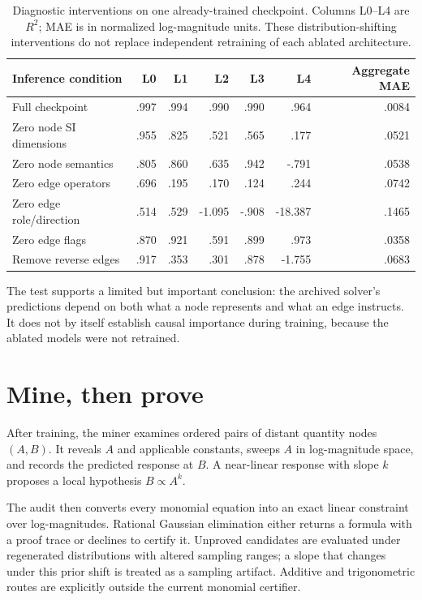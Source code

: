 \documentclass[10pt]{article}
\begin{document}
\begin{table}[H]
\centering\scriptsize
\setlength{\tabcolsep}{4.2pt}
\begin{tabular}{lrrrrrr}
\toprule
Inference condition & L0 & L1 & L2 & L3 & L4 & Aggregate MAE\\
\midrule
Full checkpoint & .997 & .994 & .990 & .990 & .964 & .0084\\
Zero node SI dimensions & .955 & .825 & .521 & .565 & .177 & .0521\\
Zero node semantics & .805 & .860 & .635 & .942 & -.791 & .0538\\
Zero edge operators & .696 & .195 & .170 & .124 & .244 & .0742\\
Zero edge role/direction & .514 & .529 & -1.095 & -.908 & -18.387 & .1465\\
Zero edge flags & .870 & .921 & .591 & .899 & .973 & .0358\\
Remove reverse edges & .917 & .353 & .301 & .878 & -1.755 & .0683\\
\bottomrule
\end{tabular}
\caption{Diagnostic interventions on one already-trained checkpoint. Columns L0--L4 are $R^2$; MAE is in normalized log-magnitude units. These distribution-shifting interventions do not replace independent retraining of each ablated architecture.}
\label{tab:ablations}
\end{table}

The test supports a limited but important conclusion: the archived solver's predictions depend on both what a node represents and what an edge instructs. It does not by itself establish causal importance during training, because the ablated models were not retrained.

\section{Mine, then prove}

After training, the miner examines ordered pairs of distant quantity nodes $(A,B)$. It reveals $A$ and applicable constants, sweeps $A$ in log-magnitude space, and records the predicted response at $B$. A near-linear response with slope $k$ proposes a local hypothesis $B\propto A^k$.

The audit then converts every monomial equation into an exact linear constraint over log-magnitudes. Rational Gaussian elimination either returns a formula with a proof trace or declines to certify it. Unproved candidates are evaluated under regenerated distributions with altered sampling ranges; a slope that changes under this prior shift is treated as a sampling artifact. Additive and trigonometric routes are explicitly outside the current monomial certifier.
\end{document}
